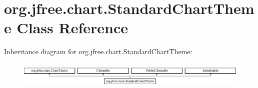 \hypertarget{classorg_1_1jfree_1_1chart_1_1_standard_chart_theme}{}\section{org.\+jfree.\+chart.\+Standard\+Chart\+Theme Class Reference}
\label{classorg_1_1jfree_1_1chart_1_1_standard_chart_theme}
Inheritance diagram for org.\+jfree.\+chart.\+Standard\+Chart\+Theme\+:\begin{figure}[H]
\begin{center}
\leavevmode
\includegraphics[height=1.244444cm]{classorg_1_1jfree_1_1chart_1_1_standard_chart_theme}
\end{center}
\end{figure}
